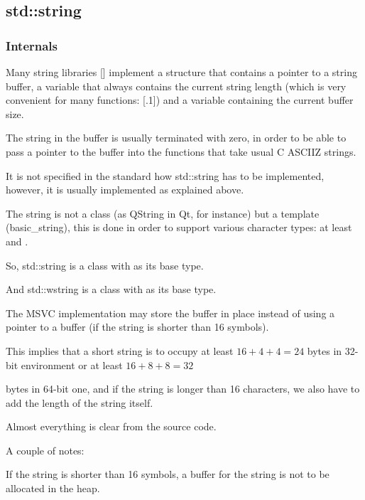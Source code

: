 \subsection{std::string}
\label{std_string}

\subsubsection{Internals}

Many string libraries [] implement a structure that contains a pointer to a string buffer,
a variable that always contains the current string length 
(which is very convenient for many functions: [.1]) and
a variable containing the current buffer size.

The string in the buffer is usually terminated with zero, in order to be able to pass a pointer to the buffer
into the functions that take  usual C \ac{ASCIIZ} strings.

It is not specified in the \Cpp standard how std::string has to be implemented,
however, it is usually implemented as explained above.

The \Cpp string is not a class (as QString in Qt, for instance) but a template (basic\_string),
this is done in order to support various character types: at least \Tchar and .

So, std::string is a class with \Tchar as its base type.

And std::wstring is a class with  as its base type.


The MSVC implementation may store the buffer in place instead of using a pointer to a buffer 
(if the string is shorter than 16 symbols).

This implies that a short string is to occupy at least $16 + 4 + 4 = 24$ 
bytes in 32-bit environment or at least $16 + 8 + 8 = 32$ 

bytes in 64-bit one, and if the string is longer than 16 characters, we also have to add the length of the string itself.



Almost everything is clear from the source code.

A couple of notes:

If the string is shorter than 16 symbols, 
a buffer for the string is not to be allocated in the \gls{heap}.

